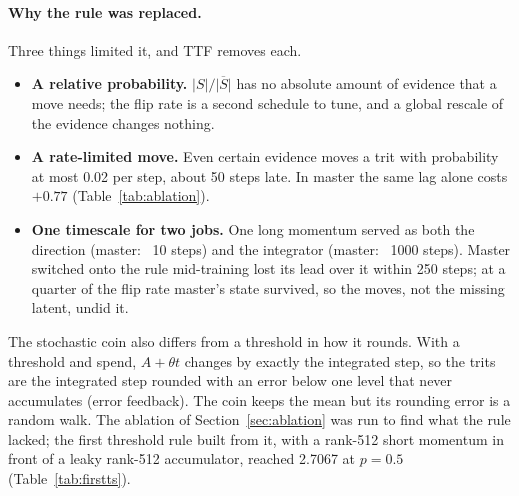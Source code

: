 \documentclass[10pt,twocolumn]{article}
\begin{document}
\paragraph{Why the rule was replaced.} Three things limited it, and TTF removes each.
\begin{itemize}
\item \textbf{A relative probability.} $|S|/\overline{|S|}$ has no absolute amount of evidence that a move needs; the flip
  rate is a second schedule to tune, and a global rescale of the evidence changes nothing.
\item \textbf{A rate-limited move.} Even certain evidence moves a trit with probability at most 0.02 per step, about 50
  steps late. In master the same lag alone costs $+0.77$ (Table~\ref{tab:ablation}).
\item \textbf{One timescale for two jobs.} One long momentum served as both the direction (master: ~10 steps) and the
  integrator (master: ~1000 steps). Master switched onto the rule mid-training lost its lead over it within 250 steps;
  at a quarter of the flip rate master's state survived, so the moves, not the missing latent, undid it.
\end{itemize}
The stochastic coin also differs from a threshold in how it rounds. With a threshold and spend, $A+\theta t$ changes by
exactly the integrated step, so the trits are the integrated step rounded with an error below one level that never
accumulates (error feedback). The coin keeps the mean but its rounding error is a random walk. The ablation of
Section~\ref{sec:ablation} was run to find what the rule lacked; the first threshold rule built from it, with a rank-512
short momentum in front of a leaky rank-512 accumulator, reached 2.7067 at $p=0.5$ (Table~\ref{tab:firstts}).

\begin{table}[t]
\centering
\caption{The first threshold rules (2 October; 110M, training-time, with a short momentum, $\theta=16$, step exponent
$p$, constant leak; master 2.7513, previous rule at rank 512 2.8215, at full rank 2.7998).}
\label{tab:firstts}
\end{table}
\end{document}
